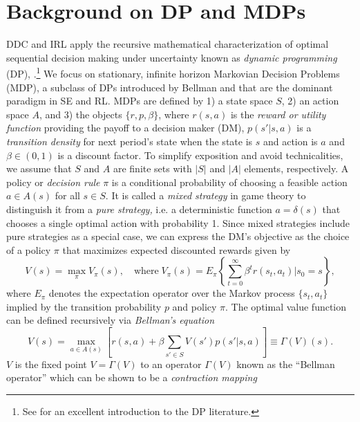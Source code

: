 \section{Background on DP and MDPs\label{sec:mdp}}

DDC and IRL apply  the recursive mathematical characterization of optimal sequential decision
making under uncertainty known as  {\it dynamic programming\/} (DP), \citet{Bellman:1957}.\footnote{\footnotesize See
\citet{bertsekas:2017} for an excellent introduction to the DP literature.} We focus 
on stationary, infinite horizon Markovian Decision Problems (MDP), a subclass of DPs introduced by Bellman and \citet{Howard:1960} that 
are the dominant paradigm in SE and RL.
MDPs are defined by  1) a state space $S$, 2) an action space $A$, and  3) the objects  $\{r,p,\beta\}$, where $r(s,a)$ is the {\it reward or utility function\/}
providing the payoff to a decision maker (DM), $p(s'|s,a)$ is a {\it transition density\/} for next period's state when the state is $s$ and action is $a$
and $\beta \in (0,1)$ is a discount factor.  To simplify exposition and avoid technicalities, we assume
that  $S$ and $A$ are finite sets with $|S|$ and $|A|$ elements, respectively.
A policy or {\it decision rule\/} $\pi$ is a conditional probability of choosing 
a feasible action $a \in A(s)$ for all $s \in S$. It is called a {\it mixed strategy\/} in game theory  to 
distinguish it from a {\it pure strategy,\/} i.e. a deterministic function $a=\delta(s)$ that
chooses a single optimal action with probability 1. Since mixed strategies include pure strategies as a special case, 
we can express the DM's objective as the choice of a policy
$\pi$ that  maximizes expected discounted rewards given by
\begin{equation}
       V(s)= \max_\pi  V_\pi(s),  \quad \mbox{where} \;  V_\pi(s) = E_\pi \left\{\sum_{t=0}^\infty \beta^t r(s_t,a_t)| s_0=s\right\},
\label{eq:vdef}
\end{equation}
where $E_\pi$ denotes the expectation operator over the Markov process $\{s_t,a_t\}$ implied by the transition probability $p$ and policy $\pi$.
The optimal value function can be defined recursively via {\it Bellman's equation\/}
\begin{equation}
            V(s) = \max_{a \in A(s)}\left[ r(s,a)+ \beta \sum_{s' \in S} V(s')p(s'|s,a)\right] \equiv \Gamma(V)(s).
\label{eq:bellman}
\end{equation}
$V$ is the fixed point $V=\Gamma(V)$ to an operator $\Gamma(V)$ known as the ``Bellman operator'' 
which can be shown to be a {\it contraction mapping\/} 
